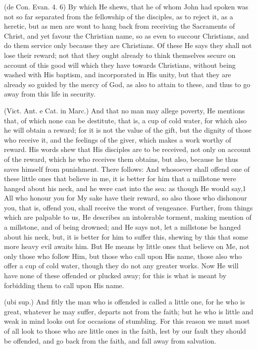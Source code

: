  (de Con. Evan. 4. 6) By which He shews, that he of whom John had spoken was not so far separated from the fellowship of the disciples, as to reject it, as a heretic, but as men are wont to hang back from receiving the Sacraments of Christ, and yet favour the Christian name, so as even to succour Christians, and do them service only because they are Christians. Of these He says they shall not lose their reward; not that they ought already to think themselves secure on account of this good will which they have towards Christians, without being washed with His baptism, and incorporated in His unity, but that they are already so guided by the mercy of God, as also to attain to these, and thus to go away from this life in security.

 (Vict. Ant. e Cat. in Marc.) And that no man may allege poverty, He mentions that, of which none can be destitute, that is, a cup of cold water, for which also he will obtain a reward; for it is not the value of the gift, but the dignity of those who receive it, and the feelings of the giver, which makes a work worthy of reward. His words shew that His disciples are to be received, not only on account of the reward, which he who receives them obtains, but also, because he thus saves himself from punishment. There follows: And whosoever shall offend one of these little ones that believe in me, it is better for him that a millstone were hanged about his neck, and he were cast into the sea: as though He would say,1 All who honour you for My sake have their reward, so also those who dishonour you, that is, offend you, shall receive the worst of vengeance. Further, from things which are palpable to us, He describes an intolerable torment, making mention of a millstone, and of being drowned; and He says not, let a millstone be hanged about his neck, but, it is better for him to suffer this, shewing by this that some more heavy evil awaits him. But He means by little ones that believe on Me, not only those who follow Him, but those who call upon His name, those also who offer a cup of cold water, though they do not any greater works. Now He will have none of these offended or plucked away; for this is what is meant by forbidding them to call upon His name.

 (ubi sup.) And fitly the man who is offended is called a little one, for he who is great, whatever he may suffer, departs not from the faith; but he who is little and weak in mind looks out for occasions of stumbling. For this reason we must most of all look to those who are little ones in the faith, lest by our fault they should be offended, and go back from the faith, and fall away from salvation.

